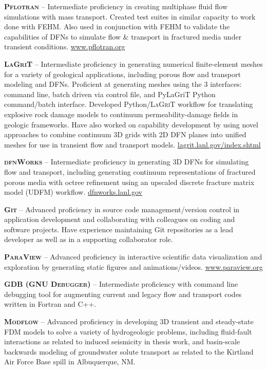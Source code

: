 \documentclass[11pt, letterpaper]{article}
\begin{document}
\textbf{\textsc{Pflotran}} -- Intermediate proficiency in creating multiphase
fluid flow simulations with mass transport. Created test suites in similar
capacity to work done with FEHM. Also used in conjunction with FEHM to validate
the capabilities of DFNs to simulate
flow \& transport in fractured media under transient conditions.
\href{https://www.pflotran.org}{www.pflotran.org} 

\textbf{\textsc{LaGriT}} -- Intermediate proficiency in generating numerical
finite-element meshes for a variety of geological applications, including
porous flow and transport modeling and DFNs. Proficient at generating meshes
using the 3 interfaces: command line, batch driven via control file, and
PyLaGriT Python command/batch interface. Developed Python/\textsc{LaGriT}
workflow for translating explosive rock damage models to continuum
permeability-damage fields in geologic frameworks. Have also worked on
capability development by using novel approaches to combine continuum 3D grids
with 2D DFN planes into unified meshes for use in transient flow and transport
models.
\href{https://lagrit.lanl.gov/index.shtml}{lagrit.lanl.gov/index.shtml}

\textbf{\textsc{dfnWorks}} -- Intermediate proficiency in generating 3D
DFNs for simulating flow and transport, including
generating continuum representations of fractured porous media with octree
refinement using an upscaled discrete fracture matrix model (UDFM) workflow.
\href{https://dfnworks.lanl.gov}{dfnworks.lanl.gov}

\textbf{\textsc{Git}} -- Advanced proficiency in source code management/version control
in application development and collaborating with colleagues on coding and software
projects. Have experience maintaining Git repositories as a lead developer as
well as in a supporting collaborator role.

\textbf{\textsc{ParaView}} -- Advanced proficiency in interactive scientific
data visualization and exploration by generating static figures and
animations/videos. \href{https://www.paraview.org/}{www.paraview.org} 

\textbf{\textsc{GDB (GNU Debugger)}} -- Intermediate proficiency with command
line debugging tool for augmenting current and legacy flow and transport codes
written in Fortran and C++.

\textbf{\textsc{Modflow}} -- Advanced proficiency in developing 3D transient
and steady-state FDM models to solve a variety of hydrogeologic problems, 
including fluid-fault interactions as related to induced seismicity in thesis
work, and basin-scale backwards modeling of groundwater solute transport as
related to the Kirtland Air Force Base spill in Albuquerque, NM.
\end{document}
